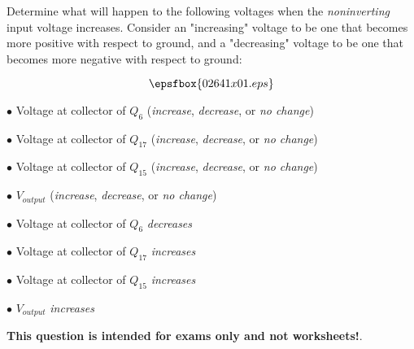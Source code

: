 

Determine what will happen to the following voltages when the {\it noninverting} input voltage increases.  Consider an "increasing" voltage to be one that becomes more positive with respect to ground, and a "decreasing" voltage to be one that becomes more negative with respect to ground:

$$\epsfbox{02641x01.eps}$$

\medskip
\item{$\bullet$} Voltage at collector of $Q_6$ ({\it increase}, {\it decrease}, or {\it no change})
\item{$\bullet$} Voltage at collector of $Q_{17}$ ({\it increase}, {\it decrease}, or {\it no change})
\item{$\bullet$} Voltage at collector of $Q_{15}$ ({\it increase}, {\it decrease}, or {\it no change})
\item{$\bullet$} $V_{output}$ ({\it increase}, {\it decrease}, or {\it no change})
\medskip







\medskip
\goodbreak
\item{$\bullet$} Voltage at collector of $Q_6$ {\it decreases}
\item{$\bullet$} Voltage at collector of $Q_{17}$ {\it increases}
\item{$\bullet$} Voltage at collector of $Q_{15}$ {\it increases}
\item{$\bullet$} $V_{output}$ {\it increases}
\medskip







{\bf This question is intended for exams only and not worksheets!}.





